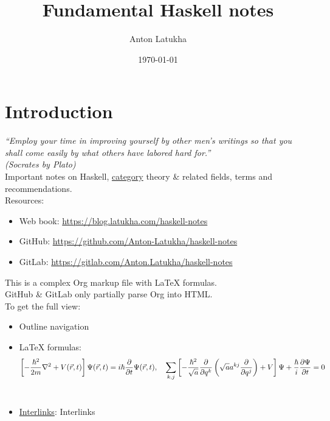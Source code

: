 \documentclass[11pt]{article}
\author{Anton Latukha}
\date{\today}
\title{Fundamental Haskell notes}
\begin{document}
\maketitle
\setcounter{tocdepth}{10}
\tableofcontents

\setcounter{tocdepth}{10}
\tableofcontents
\setcounter{secnumdepth}{10}

\section{Introduction}
\label{sec:orgda49760}

\emph{“Employ your time in improving yourself by other men's writings so that you shall come easily by what others have labored hard for.”\\
(Socrates by Plato)}\\

Important notes on Haskell, \hyperref[org0450535]{category} theory \& related fields, terms and recommendations.\\

Resources:\\
\begin{itemize}
\item Web book: \url{https://blog.latukha.com/haskell-notes}\\
\item GitHub: \url{https://github.com/Anton-Latukha/haskell-notes}\\
\item GitLab: \url{https://gitlab.com/Anton.Latukha/haskell-notes}\\
\end{itemize}

This is a complex Org markup file with \LaTeX{} formulas.\\
GitHub \& GitLab only partially parse Org into HTML.\\

To get the full view:\\
\begin{itemize}
\item Outline navigation\\
\item \LaTeX{} formulas: $$ {\displaystyle\left[{-\frac{\hbar^{2}}{2m}}\nabla^{2}+V(\vec{r},t)\right]\Psi({\vec{r}},t)=i\hbar{\partial\over\partial{t}}\Psi({\vec{r}},t),\quad\sum_{k,j}\left[-{\frac{\hbar^{2}}{\sqrt{a}}}{\frac{\partial}{\partial{q^{k}}}}\left({\sqrt{a}}a^{kj}{\frac{\partial}{\partial{q^{j}}}}\right)+V\right]\Psi+{\frac{\hbar}{i}}{\frac{\partial{\Psi}}{\partial{t}}}=0} $$\\
\item \hyperref[org3c0f6c8]{Interlinks}: \label{org3c0f6c8}Interlinks\\
\end{itemize}
\end{document}
